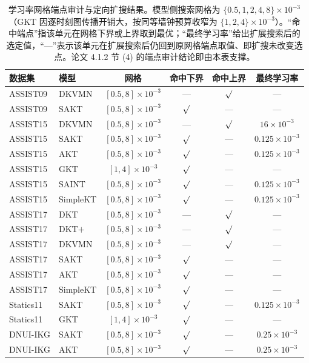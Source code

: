 \begin{table}[t]
\centering
\caption{学习率网格端点审计与定向扩搜结果。模型侧搜索网格为 $\{0.5,1,2,4,8\}\times10^{-3}$（GKT 因逐时刻图传播开销大，按同等墙钟预算收窄为 $\{1,2,4\}\times10^{-3}$）。``命中端点''指该单元在网格下界或上界取到最优；``最终学习率''给出扩展搜索后的选定值，``—''表示该单元在扩展搜索后仍回到原网格端点取值、即扩搜未改变选点。论文 4.1.2 节 (4) 的端点审计结论即由本表支撑。}
\label{tab:endpoint}
\small
\begin{tabular}{llcccc}
\toprule
数据集 & 模型 & 网格 & 命中下界 & 命中上界 & 最终学习率 \\
\midrule
ASSIST09 & DKVMN & $[0.5,8]\times10^{-3}$ & — & $\surd$ & — \\
ASSIST09 & SAKT & $[0.5,8]\times10^{-3}$ & $\surd$ & — & — \\
\midrule
ASSIST15 & DKVMN & $[0.5,8]\times10^{-3}$ & — & $\surd$ & $16\times10^{-3}$ \\
ASSIST15 & SAKT & $[0.5,8]\times10^{-3}$ & $\surd$ & — & $0.125\times10^{-3}$ \\
ASSIST15 & AKT & $[0.5,8]\times10^{-3}$ & $\surd$ & — & $0.125\times10^{-3}$ \\
ASSIST15 & GKT & $[1,4]\times10^{-3}$ & $\surd$ & — & — \\
ASSIST15 & SAINT & $[0.5,8]\times10^{-3}$ & $\surd$ & — & $0.125\times10^{-3}$ \\
ASSIST15 & SimpleKT & $[0.5,8]\times10^{-3}$ & $\surd$ & — & $0.125\times10^{-3}$ \\
\midrule
ASSIST17 & DKT & $[0.5,8]\times10^{-3}$ & — & $\surd$ & — \\
ASSIST17 & DKT$+$ & $[0.5,8]\times10^{-3}$ & — & $\surd$ & — \\
ASSIST17 & DKVMN & $[0.5,8]\times10^{-3}$ & — & $\surd$ & — \\
ASSIST17 & SAKT & $[0.5,8]\times10^{-3}$ & $\surd$ & — & — \\
ASSIST17 & AKT & $[0.5,8]\times10^{-3}$ & $\surd$ & — & — \\
ASSIST17 & SimpleKT & $[0.5,8]\times10^{-3}$ & $\surd$ & — & — \\
\midrule
Statics11 & SAKT & $[0.5,8]\times10^{-3}$ & $\surd$ & — & $0.125\times10^{-3}$ \\
Statics11 & GKT & $[1,4]\times10^{-3}$ & $\surd$ & — & — \\
\midrule
DNUI-IKG & SAKT & $[0.5,8]\times10^{-3}$ & $\surd$ & — & $0.25\times10^{-3}$ \\
DNUI-IKG & AKT & $[0.5,8]\times10^{-3}$ & $\surd$ & — & $0.25\times10^{-3}$ \\

\end{tabular}
\end{table}
